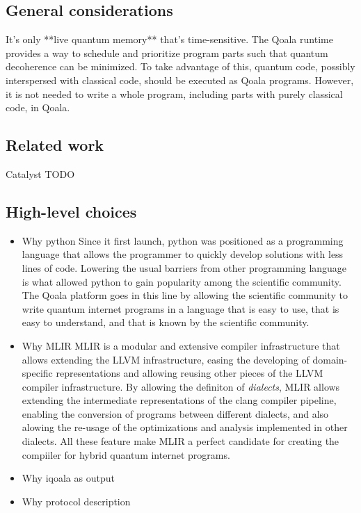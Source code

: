 \subsection{General considerations}
It's only **live quantum memory** that's time-sensitive.
The Qoala runtime provides a way to schedule and prioritize program parts such that quantum decoherence can be minimized.
To take advantage of this, quantum code, possibly interspersed with classical code, should be executed as Qoala programs.
However, it is not needed to write a whole program, including parts with purely classical code, in Qoala.


\subsection{Related work}
Catalyst
TODO

\subsection{High-level choices}
\begin{itemize}
\item Why python
  Since it first launch, python was positioned as a programming language that allows the programmer to quickly develop
  solutions with less lines of code. Lowering the usual barriers from other programming language is what allowed python
  to gain popularity among the scientific community.
  The Qoala platform goes in this line by allowing the scientific community to write quantum internet programs in a
  language that is easy to use, that is easy to understand, and that is known by the scientific community.
\item Why MLIR
  MLIR is a modular and extensive compiler infrastructure that allows extending the LLVM infrastructure, easing the
  developing of domain-specific representations and allowing reusing other pieces of the LLVM compiler infrastructure.
  By allowing the definiton of \textit{dialects}, MLIR allows extending the intermediate representations of the clang compiler
  pipeline, enabling the conversion of programs between different dialects, and also alowing the re-usage of the
  optimizations and analysis implemented in other dialects.
  All these feature make MLIR a perfect candidate for creating the compiiler for hybrid quantum internet programs.
\item Why iqoala as output
\item Why protocol description
\end{itemize}
    

